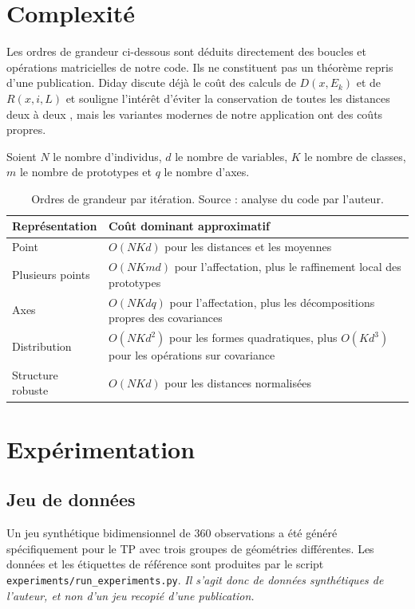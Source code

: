\documentclass[12pt,a4paper]{article}
\begin{document}
\section{Complexité}

Les ordres de grandeur ci-dessous sont déduits directement des boucles et opérations matricielles de notre code. Ils ne constituent pas un théorème repris d'une publication. Diday discute déjà le coût des calculs de $D(x,E_k)$ et de $R(x,i,L)$ et souligne l'intérêt d'éviter la conservation de toutes les distances deux à deux \cite[p.~24]{diday1971}, mais les variantes modernes de notre application ont des coûts propres.

Soient $N$ le nombre d'individus, $d$ le nombre de variables, $K$ le nombre de classes, $m$ le nombre de prototypes et $q$ le nombre d'axes.

\begin{table}[H]
\centering
\caption{Ordres de grandeur par itération. Source : analyse du code par l'auteur.}
\begin{tabular}{p{3.4cm}p{8.3cm}}
\toprule
\textbf{Représentation} & \textbf{Coût dominant approximatif} \\
\midrule
Point & $O(NKd)$ pour les distances et les moyennes \\
Plusieurs points & $O(NKmd)$ pour l'affectation, plus le raffinement local des prototypes \\
Axes & $O(NKdq)$ pour l'affectation, plus les décompositions propres des covariances \\
Distribution & $O(NKd^2)$ pour les formes quadratiques, plus $O(Kd^3)$ pour les opérations sur covariance \\
Structure robuste & $O(NKd)$ pour les distances normalisées \\
\bottomrule
\end{tabular}
\end{table}

\section{Expérimentation}

\subsection{Jeu de données}

Un jeu synthétique bidimensionnel de 360 observations a été généré spécifiquement pour le TP avec trois groupes de géométries différentes. Les données et les étiquettes de référence sont produites par le script \texttt{experiments/run\_experiments.py}. \textit{Il s'agit donc de données synthétiques de l'auteur, et non d'un jeu recopié d'une publication.}
\end{document}
